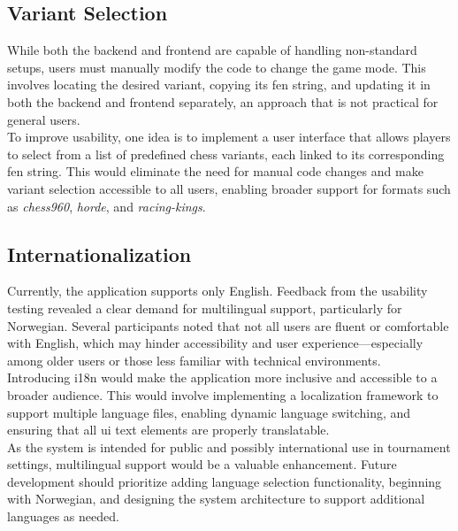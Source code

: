 \subsection{Variant Selection}
While both the backend and frontend are capable of handling non-standard setups, users must manually modify the code to change the game mode. This involves locating the desired variant, copying its \gls{fen} string, and updating it in both the backend and frontend separately, an approach that is not practical for general users. \\

To improve usability, one idea is to implement a user interface that allows players to select from a list of predefined chess variants, each linked to its corresponding \gls{fen} string. This would eliminate the need for manual code changes and make variant selection accessible to all users, enabling broader support for formats such as \textit{\gls{chess960}}, \textit{\gls{horde}}, and \textit{\gls{racing-kings}}.

\subsection{Internationalization}
Currently, the application supports only English. Feedback from the usability testing revealed a clear demand for multilingual support, particularly for Norwegian. Several participants noted that not all users are fluent or comfortable with English, which may hinder accessibility and user experience—especially among older users or those less familiar with technical environments. \\

Introducing \gls{i18n} would make the application more inclusive and accessible to a broader audience. This would involve implementing a localization framework to support multiple language files, enabling dynamic language switching, and ensuring that all \gls{ui} text elements are properly translatable. \\

As the system is intended for public and possibly international use in tournament settings, multilingual support would be a valuable enhancement. Future development should prioritize adding language selection functionality, beginning with Norwegian, and designing the system architecture to support additional languages as needed.
